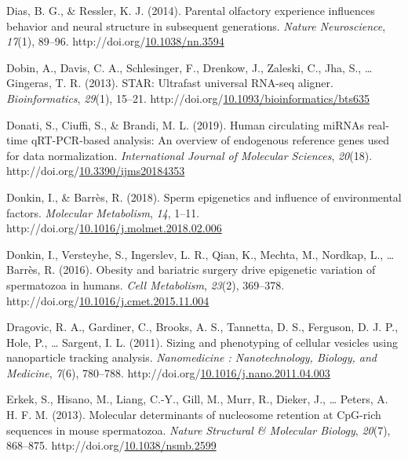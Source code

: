 \documentclass[12pt,twoside]{reedthesis}
\newlength{\cslhangindent}
\newenvironment{CSLReferences}[2] %
 {%
  \setlength{\parindent}{0pt}
  \ifodd #1 \everypar{\setlength{\hangindent}{\cslhangindent}}\ignorespaces\fi
  \ifnum #2 > 0
  \setlength{\parskip}{#2\baselineskip}
  \fi
 }%
 {}
\begin{document}
\begin{CSLReferences}{1}{0}
\leavevmode{}%
Dias, B. G., \& Ressler, K. J. (2014). Parental olfactory experience influences behavior and neural structure in subsequent generations. \emph{Nature Neuroscience}, \emph{17}(1), 89--96. http://doi.org/\href{https://doi.org/10.1038/nn.3594}{10.1038/nn.3594}

\leavevmode{}%
Dobin, A., Davis, C. A., Schlesinger, F., Drenkow, J., Zaleski, C., Jha, S., \ldots{} Gingeras, T. R. (2013). {STAR}: Ultrafast universal {RNA}-seq aligner. \emph{Bioinformatics}, \emph{29}(1), 15--21. http://doi.org/\href{https://doi.org/10.1093/bioinformatics/bts635}{10.1093/bioinformatics/bts635}

\leavevmode{}%
Donati, S., Ciuffi, S., \& Brandi, M. L. (2019). Human circulating miRNAs real-time qRT-PCR-based analysis: An overview of endogenous reference genes used for data normalization. \emph{International Journal of Molecular Sciences}, \emph{20}(18). http://doi.org/\href{https://doi.org/10.3390/ijms20184353}{10.3390/ijms20184353}

\leavevmode{}%
Donkin, I., \& Barrès, R. (2018). Sperm epigenetics and influence of environmental factors. \emph{Molecular Metabolism}, \emph{14}, 1--11. http://doi.org/\href{https://doi.org/10.1016/j.molmet.2018.02.006}{10.1016/j.molmet.2018.02.006}

\leavevmode{}%
Donkin, I., Versteyhe, S., Ingerslev, L. R., Qian, K., Mechta, M., Nordkap, L., \ldots{} Barrès, R. (2016). Obesity and bariatric surgery drive epigenetic variation of spermatozoa in humans. \emph{Cell Metabolism}, \emph{23}(2), 369--378. http://doi.org/\href{https://doi.org/10.1016/j.cmet.2015.11.004}{10.1016/j.cmet.2015.11.004}

\leavevmode{}%
Dragovic, R. A., Gardiner, C., Brooks, A. S., Tannetta, D. S., Ferguson, D. J. P., Hole, P., \ldots{} Sargent, I. L. (2011). Sizing and phenotyping of cellular vesicles using nanoparticle tracking analysis. \emph{Nanomedicine : Nanotechnology, Biology, and Medicine}, \emph{7}(6), 780--788. http://doi.org/\href{https://doi.org/10.1016/j.nano.2011.04.003}{10.1016/j.nano.2011.04.003}

\leavevmode{}%
Erkek, S., Hisano, M., Liang, C.-Y., Gill, M., Murr, R., Dieker, J., \ldots{} Peters, A. H. F. M. (2013). Molecular determinants of nucleosome retention at CpG-rich sequences in mouse spermatozoa. \emph{Nature Structural \& Molecular Biology}, \emph{20}(7), 868--875. http://doi.org/\href{https://doi.org/10.1038/nsmb.2599}{10.1038/nsmb.2599}


\end{CSLReferences}
\end{document}
